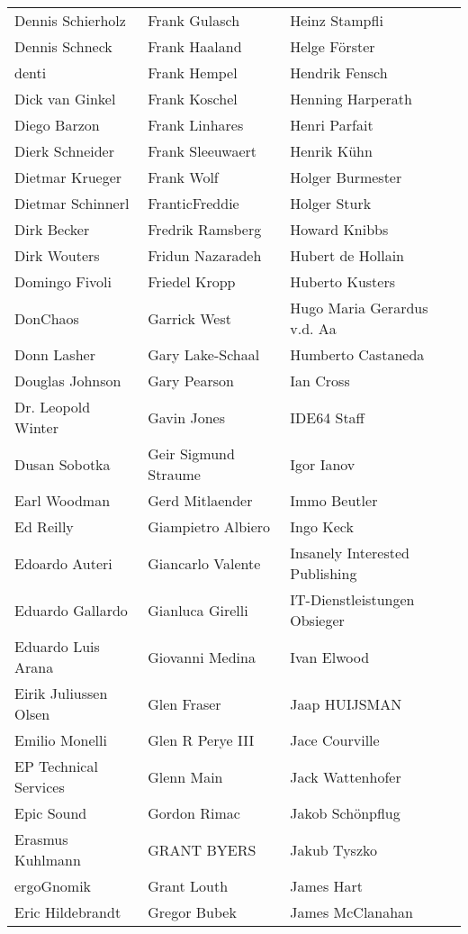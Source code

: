 \begin{tabular}{p{4.5cm}p{4.5cm}p{4.5cm}}
Dennis Schierholz & Frank Gulasch & Heinz Stampfli \\
Dennis Schneck & Frank Haaland & Helge Förster \\
denti & Frank Hempel & Hendrik Fensch \\
Dick van Ginkel & Frank Koschel & Henning Harperath \\
Diego Barzon & Frank Linhares & Henri Parfait \\
Dierk Schneider & Frank Sleeuwaert & Henrik Kühn \\
Dietmar Krueger & Frank Wolf & Holger Burmester \\
Dietmar Schinnerl & FranticFreddie & Holger Sturk \\
Dirk Becker & Fredrik Ramsberg & Howard Knibbs \\
Dirk Wouters & Fridun Nazaradeh & Hubert de Hollain \\
Domingo Fivoli & Friedel Kropp & Huberto Kusters \\
DonChaos & Garrick West & Hugo Maria Gerardus v.d. Aa \\
Donn Lasher & Gary Lake-Schaal & Humberto Castaneda \\
Douglas Johnson & Gary Pearson & Ian Cross \\
Dr. Leopold Winter & Gavin Jones & IDE64 Staff \\
Dusan Sobotka & Geir Sigmund Straume & Igor Ianov \\
Earl Woodman & Gerd Mitlaender & Immo Beutler \\
Ed Reilly & Giampietro Albiero & Ingo Keck \\
Edoardo Auteri & Giancarlo Valente & Insanely Interested Publishing \\
Eduardo Gallardo & Gianluca Girelli & IT-Dienstleistungen Obsieger \\
Eduardo Luis Arana & Giovanni Medina & Ivan Elwood \\
Eirik Juliussen Olsen & Glen Fraser & Jaap HUIJSMAN \\
Emilio Monelli & Glen R Perye III & Jace Courville \\
EP Technical Services & Glenn Main & Jack Wattenhofer \\
Epic Sound & Gordon Rimac & Jakob Schönpflug \\
Erasmus Kuhlmann & GRANT BYERS & Jakub Tyszko \\
ergoGnomik & Grant Louth & James Hart \\
Eric Hildebrandt & Gregor Bubek & James McClanahan \\

\end{tabular}
